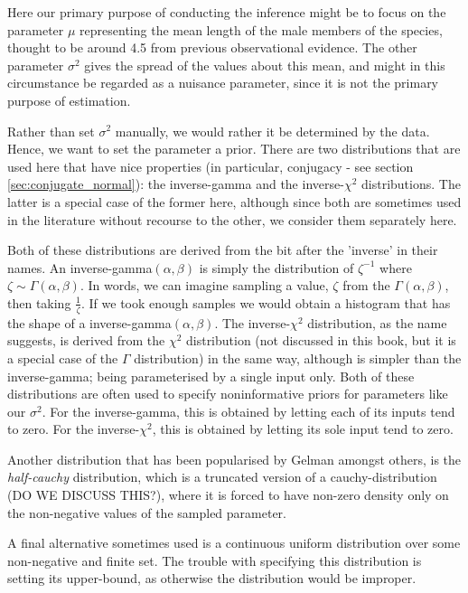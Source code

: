 \documentclass[11pt,fullpage]{book}
\begin{document}
Here our primary purpose of conducting the inference might be to focus on the parameter $\mu$ representing the mean length of the male members of the species, thought to be around 4.5 from previous observational evidence. The other parameter $\sigma^2$ gives the spread of the values about this mean, and might in this circumstance be regarded as a nuisance parameter, since it is not the primary purpose of estimation.

Rather than set $\sigma^2$ manually, we would rather it be determined by the data. Hence, we want to set the parameter a prior. There are two distributions that are used here that have nice properties (in particular, conjugacy - see section \ref{sec:conjugate_normal}): the inverse-gamma and the inverse-$\chi^2$ distributions. The latter is a special case of the former here, although since both are sometimes used in the literature without recourse to the other, we consider them separately here.

Both of these distributions are derived from the bit after the 'inverse' in their names. An inverse-gamma$(\alpha,\beta)$ is simply the distribution of $\zeta^{-1}$ where $\zeta\sim\Gamma(\alpha,\beta)$. In words, we can imagine sampling a value, $\zeta$ from the $\Gamma(\alpha,\beta)$, then taking $\frac{1}{\zeta}$. If we took enough samples we would obtain a histogram that has the shape of a inverse-gamma$(\alpha,\beta)$. The inverse-$\chi^2$ distribution, as the name suggests, is derived from the $\chi^2$ distribution (not discussed in this book, but it is a special case of the $\Gamma$ distribution) in the same way, although is simpler than the inverse-gamma; being parameterised by a single input only. Both of these distributions are often used to specify noninformative priors for parameters like our $\sigma^2$. For the inverse-gamma, this is obtained by letting each of its inputs tend to zero. For the inverse-$\chi^2$, this is obtained by letting its sole input tend to zero.

Another distribution that has been popularised by Gelman amongst others, is the \textit{half-cauchy} distribution, which is a truncated version of a cauchy-distribution (DO WE DISCUSS THIS?), where it is forced to have non-zero density only on the non-negative values of the sampled parameter.

A final alternative sometimes used is a continuous uniform distribution over some non-negative and finite set. The trouble with specifying this distribution is setting its upper-bound, as otherwise the distribution would be improper.
\end{document}

